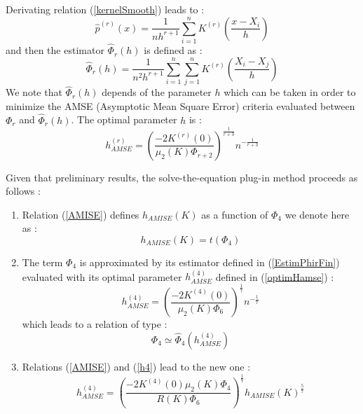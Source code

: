 {  Derivating relation (\ref{kernelSmooth}) leads to :
  \begin{equation}
    \label{kernelSmoothDerivative}
    \hat{p}^{(r)}(x) = \displaystyle \frac{1}{nh^{r+1}}\sum_{i=1}^{n} K^{(r)}\left(\frac{x-X_i}{h}\right)
  \end{equation}
  and then the estimator $\hat{\Phi}_r(h)$ is defined as :
  \begin{equation}
    \label{EstimPhirFin}
    \hat{\Phi}_r(h) = \displaystyle \frac{1}{n^2h^{r+1}}\sum_{i=1}^{n}\sum_{j=1}^{n} K^{(r)}\left(\frac{X_i-X_j}{h}\right)
  \end{equation}
  We note that   $\hat{\Phi}_r(h)$ depends of the parameter $h$ which can be taken in order to minimize the AMSE (Asymptotic Mean  Square Error) criteria evaluated between $\Phi_r$ and  $\hat{\Phi}_r(h)$. The optimal parameter $h$ is :
  \begin{equation}
    \label{optimHamse}
    h^{(r)}_{AMSE} = \displaystyle \left(\frac{-2K^{(r)}(0)}{\mu_2(K)\Phi_{r+2}}\right)^{\frac{1}{r+3}}n^{-\frac{1}{r+3}}
  \end{equation}





  Given that preliminary results, the solve-the-equation plug-in method  proceeds as follows :
  \begin{enumerate}
  \item Relation (\ref{AMISE}) defines $h_{AMISE}(K)$ as a function of $\Phi_4$ we denote here as :
    \begin{equation}
      \label{rel1}
      h_{AMISE}(K) = t(\Phi_4)
    \end{equation}
  \item The term  $\Phi_4$ is approximated by its estimator defined in (\ref{EstimPhirFin}) evaluated with its optimal parameter $h^{(4)}_{AMSE}$ defined in (\ref{optimHamse}) :
    \begin{equation}
      \label{h4}
      h^{(4)}_{AMSE} = \displaystyle \left(\frac{-2K^{(4)}(0)}{\mu_2(K)\Phi_{6}}\right)^{\frac{1}{7}}n^{-\frac{1}{7}}
    \end{equation}
    which leads to a relation of type :
    \begin{equation}
      \label{rel2}
      \Phi_4 \simeq  \hat{\Phi}_4(h^{(4)}_{AMSE})
    \end{equation}

  \item Relations (\ref{AMISE}) and (\ref{h4}) lead to the new one :
    \begin{equation}
      \label{h4hAmise}
      h^{(4)}_{AMSE} = \displaystyle \left( \frac{-2K^{(4)}(0)\mu_2(K)\Phi_4}{R(K)\Phi_{6}}\right) ^{\frac{1}{7}}h_{AMISE}(K)^{\frac{5}{7}}
    \end{equation}


\end{enumerate}}
